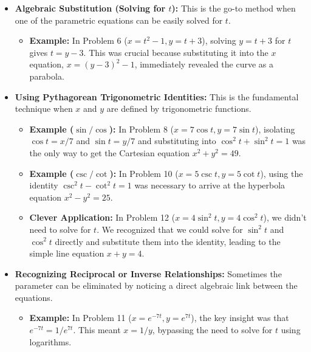 \documentclass{article}
\begin{document}
\begin{itemize}
    \item \textbf{Algebraic Substitution (Solving for $t$):} This is the go-to method when one of the parametric equations can be easily solved for $t$.
        \begin{itemize}
            \item \textbf{Example:} In Problem 6 ($x=t^2-1, y=t+3$), solving $y=t+3$ for $t$ gives $t=y-3$. This was crucial because substituting it into the $x$ equation, $x=(y-3)^2-1$, immediately revealed the curve as a parabola.
        \end{itemize}

    \item \textbf{Using Pythagorean Trigonometric Identities:} This is the fundamental technique when $x$ and $y$ are defined by trigonometric functions.
        \begin{itemize}
            \item \textbf{Example ($\sin/\cos$):} In Problem 8 ($x=7\cos t, y=7\sin t$), isolating $\cos t = x/7$ and $\sin t = y/7$ and substituting into $\cos^2 t + \sin^2 t = 1$ was the only way to get the Cartesian equation $x^2+y^2=49$.
            \item \textbf{Example ($\csc/\cot$):} In Problem 10 ($x=5\csc t, y=5\cot t$), using the identity $\csc^2 t - \cot^2 t = 1$ was necessary to arrive at the hyperbola equation $x^2-y^2=25$.
            \item \textbf{Clever Application:} In Problem 12 ($x=4\sin^2 t, y=4\cos^2 t$), we didn't need to solve for $t$. We recognized that we could solve for $\sin^2 t$ and $\cos^2 t$ directly and substitute them into the identity, leading to the simple line equation $x+y=4$.
        \end{itemize}
    
    \item \textbf{Recognizing Reciprocal or Inverse Relationships:} Sometimes the parameter can be eliminated by noticing a direct algebraic link between the equations.
        \begin{itemize}
            \item \textbf{Example:} In Problem 11 ($x=e^{-7t}, y=e^{7t}$), the key insight was that $e^{-7t} = 1/e^{7t}$. This meant $x = 1/y$, bypassing the need to solve for $t$ using logarithms.
        \end{itemize}
    

\end{itemize}
\end{document}
